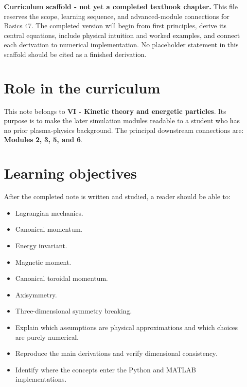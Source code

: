 \documentclass[11pt]{article}
\begin{document}

\begin{overviewbox}
\textbf{Curriculum scaffold - not yet a completed textbook chapter.} This file reserves the scope, learning sequence, and advanced-module connections for Basics 47. The completed version will begin from first principles, derive its central equations, include physical intuition and worked examples, and connect each derivation to numerical implementation. No placeholder statement in this scaffold should be cited as a finished derivation.
\end{overviewbox}

\ProjectTOC

\section{Role in the curriculum}
This note belongs to \textbf{VI - Kinetic theory and energetic particles}. Its purpose is to make the later simulation modules readable to a student who has no prior plasma-physics background. The principal downstream connections are: \textbf{Modules 2, 3, 5, and 6}.

\section{Learning objectives}
After the completed note is written and studied, a reader should be able to:
\begin{itemize}[leftmargin=1.6em]
\item Lagrangian mechanics.
\item Canonical momentum.
\item Energy invariant.
\item Magnetic moment.
\item Canonical toroidal momentum.
\item Axisymmetry.
\item Three-dimensional symmetry breaking.
\item Explain which assumptions are physical approximations and which choices are purely numerical.
\item Reproduce the main derivations and verify dimensional consistency.
\item Identify where the concepts enter the Python and MATLAB implementations.
\end{itemize}
\end{document}
